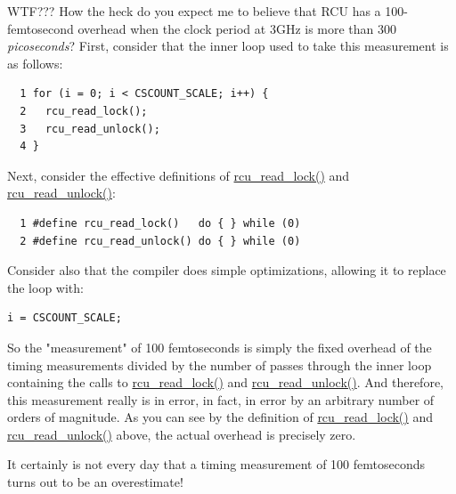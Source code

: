 \QuickQ{}
	WTF???
	How the heck do you expect me to believe that RCU has a
	100-femtosecond overhead when the clock period at 3GHz is more than
	300 \emph{picoseconds}?
\QuickA{}
	First, consider that the inner loop used to
	take this measurement is as follows:

\vspace{5pt}
\begin{minipage}[t]{\columnwidth}
\small
\begin{verbatim}
  1 for (i = 0; i < CSCOUNT_SCALE; i++) {
  2   rcu_read_lock();
  3   rcu_read_unlock();
  4 }
\end{verbatim}
\end{minipage}
\vspace{5pt}

	Next, consider the effective definitions of \url{rcu_read_lock()}
	and \url{rcu_read_unlock()}:

\vspace{5pt}
\begin{minipage}[t]{\columnwidth}
\small
\begin{verbatim}
  1 #define rcu_read_lock()   do { } while (0)
  2 #define rcu_read_unlock() do { } while (0)
\end{verbatim}
\end{minipage}
\vspace{5pt}

	Consider also that the compiler does simple optimizations,
	allowing it to replace the loop with:

\vspace{5pt}
\begin{minipage}[t]{\columnwidth}
\small
\begin{verbatim}
i = CSCOUNT_SCALE;
\end{verbatim}
\end{minipage}
\vspace{5pt}

	So the "measurement" of 100 femtoseconds is simply the fixed
	overhead of the timing measurements divided by the number of
	passes through the inner loop containing the calls
	to \url{rcu_read_lock()} and \url{rcu_read_unlock()}.
	And therefore, this measurement really is in error, in fact,
	in error by an arbitrary number of orders of magnitude.
	As you can see by the definition of \url{rcu_read_lock()}
	and \url{rcu_read_unlock()} above, the actual overhead
	is precisely zero.

	It certainly is not every day that a timing measurement of
	100 femtoseconds turns out to be an overestimate!

